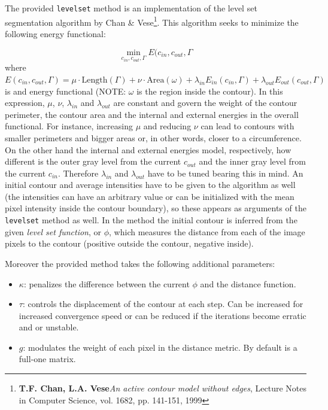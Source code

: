 The provided \texttt{levelset} method is an implementation of the level set segmentation algorithm by  Chan \& Vese\footnote{\textbf{T.F. Chan, L.A. Vese}\emph{An active contour model without edges}, Lecture Notes in Computer Science, vol. 1682, pp. 141-151, 1999}. This algorithm seeks to minimize the following energy functional:

\[ \min_{c_{in}, c_{out}, \Gamma} E(c_{in}, c_{out}, \Gamma \]
where $ E(c_{in}, c_{out}, \Gamma) = \mu \cdot \mathrm{Length}(\Gamma) + \nu \cdot \mathrm{Area}(\omega) + \lambda_{in} E_{in} (c_{in}, \Gamma) + \lambda_{out} E_{out} (c_{out}, \Gamma) $ is and energy functional (NOTE: $ \omega $ is the region inside the contour). In this expression, $ \mu $, $ \nu $, $ \lambda_{in} $ and $ \lambda_{out} $ are constant and govern the weight of the contour perimeter, the contour area and the internal and external energies in the overall functional. For instance, increasing $ \mu $ and reducing $ \nu $ can lead to contours with smaller perimeters and bigger areas or, in other words, closer to a circumference. On the other hand the internal and external energies model, respectively, how different is the outer gray level from the current $ c_{out} $ and the inner gray level from the current $ c_{in} $. Therefore $ \lambda_{in} $ and $ \lambda_{out} $ have to be tuned bearing this in mind. An initial contour and average intensities have to be given to the algorithm as well (the intensities can have an arbitrary value or can be initialized with the mean pixel intensity inside the contour boundary), so these appears as arguments of the \texttt{levelset} method as well. In the method the initial contour is inferred from the given \emph{level set function}, or $ \phi $, which measures the distance from each of the image pixels to the contour (positive outside the contour, negative inside).

Moreover the provided method takes the following additional parameters:
\begin{itemize}
	\item $ \kappa $: penalizes the difference between the current $ \phi $ and the distance function.
	\item $ \tau $: controls the displacement of the contour at each step. Can be increased for increased convergence speed or can be reduced if the iterations become erratic and or unstable.
	\item $ g $: modulates the weight of each pixel in the distance metric. By default is a full-one matrix.
\end{itemize}


